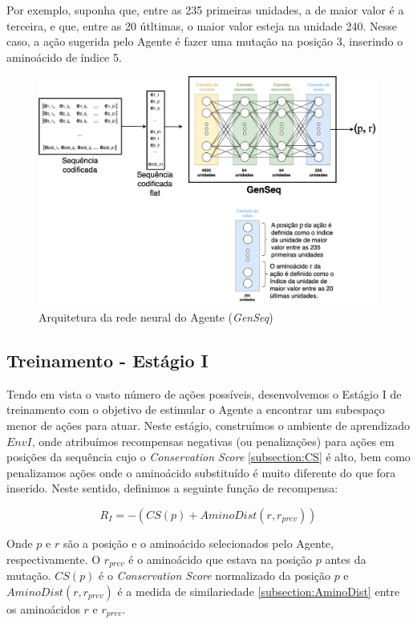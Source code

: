 Por exemplo, suponha que, entre as 235 primeiras unidades, a de maior valor é a terceira, e que, entre as 20 útltimas, o maior valor esteja na unidade 240. 
Nesse caso, a ação sugerida pelo Agente é fazer uma mutação na posição 3, inserindo o aminoácido de índice 5.

\begin{figure}[H]
  \centering
  \includegraphics[width=.8\textwidth]{figuras/metodologia-NN_arch_actor.jpg}
  \caption{Arquitetura da rede neural do Agente (\textit{GenSeq})}
  \label{fig:actor_arch}
\end{figure}


\subsection{Treinamento - Estágio I}
\label{subsection:stage1}

Tendo em vista o vasto número de ações possíveis, 
desenvolvemos o Estágio I de treinamento com o objetivo de estimular o Agente a encontrar um subespaço menor de ações para atuar.
Neste estágio, construímos o ambiente de aprendizado $EnvI$, onde atribuímos recompensas negativas (ou penalizações) 
para ações em posições da sequência cujo o \textit{Conservation Score} \ref{subsection:CS} é alto,
bem como penalizamos ações onde o aminoácido substituído é muito diferente do que fora inserido. 
Neste sentido, definimos a seguinte função de recompensa:

\begin{equation}
    R_{I} = -(CS(p) + AminoDist(r, r_{prev}))
\end{equation}

\noindent
Onde $p$ e $r$ são a posição e o aminoácido selecionados pelo Agente, respectivamente. 
O $r_{prev}$ é o aminoácido que estava na posição $p$ antes da mutação. 
$CS(p)$ é o \textit{Conservation Score} normalizado da posição $p$ e $AminoDist(r, r_{prev})$ 
é a medida de similariedade \ref{subsection:AminoDist} entre os aminoácidos $r$ e $r_{prev}$.

